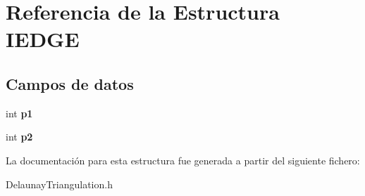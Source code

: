 \hypertarget{structIEDGE}{}\section{Referencia de la Estructura I\+E\+D\+G\+E}
\label{structIEDGE}
\subsection*{Campos de datos}
\begin{DoxyCompactItemize}
\item 
\hypertarget{structIEDGE_a38d2facfa290c17f417fb8c8375455e3}{}int {\bfseries p1}\label{structIEDGE_a38d2facfa290c17f417fb8c8375455e3}

\item 
\hypertarget{structIEDGE_a78aa0fc06147e253ae572ce7efc5be5a}{}int {\bfseries p2}\label{structIEDGE_a78aa0fc06147e253ae572ce7efc5be5a}

\end{DoxyCompactItemize}


La documentación para esta estructura fue generada a partir del siguiente fichero\+:\begin{DoxyCompactItemize}
\item 
Delaunay\+Triangulation.\+h\end{DoxyCompactItemize}
